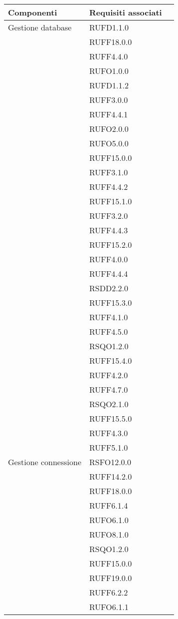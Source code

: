 \begin{center}
\begin{longtable}{lp{}l}
\toprule Componenti & Requisiti associati\\
\midrule
Gestione database & RUFD1.1.0 \\
 & RUFF18.0.0 \\
 & RUFF4.4.0 \\
 & RUFO1.0.0 \\
 & RUFD1.1.2 \\
 & RUFF3.0.0 \\
 & RUFF4.4.1 \\
 & RUFO2.0.0 \\
 & RUFO5.0.0 \\
 & RUFF15.0.0 \\
 & RUFF3.1.0 \\
 & RUFF4.4.2 \\
 & RUFF15.1.0 \\
 & RUFF3.2.0 \\
 & RUFF4.4.3 \\
 & RUFF15.2.0 \\
 & RUFF4.0.0 \\
 & RUFF4.4.4 \\
 & RSDD2.2.0 \\
 & RUFF15.3.0 \\
 & RUFF4.1.0 \\
 & RUFF4.5.0 \\
 & RSQO1.2.0 \\
 & RUFF15.4.0 \\
 & RUFF4.2.0 \\
 & RUFF4.7.0 \\
 & RSQO2.1.0 \\
 & RUFF15.5.0 \\
 & RUFF4.3.0 \\
 & RUFF5.1.0 \\
Gestione connessione & RSFO12.0.0 \\
 & RUFF14.2.0 \\
 & RUFF18.0.0 \\
 & RUFF6.1.4 \\
 & RUFO6.1.0 \\
 & RUFO8.1.0 \\
 & RSQO1.2.0 \\
 & RUFF15.0.0 \\
 & RUFF19.0.0 \\
 & RUFF6.2.2 \\
 & RUFO6.1.1 \\

\end{longtable}
\end{center}
